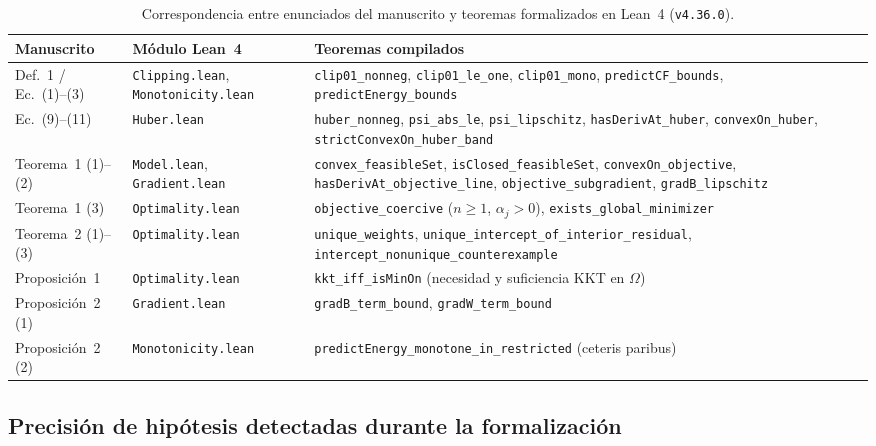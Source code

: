 \begin{table}[!htbp]
\centering
\caption{Correspondencia entre enunciados del manuscrito y teoremas formalizados en Lean~4 (\texttt{v4.36.0}).}
\label{tab:lean4-correspondencia}
\small
\begin{tabularx}{\textwidth}{@{}p{2.3cm}p{2.8cm}L@{}}
\toprule
\textbf{Manuscrito} & \textbf{Módulo Lean~4} & \textbf{Teoremas compilados} \\
\midrule
Def.~1 / Ec.~(1)--(3) & \texttt{Clipping.lean}, \texttt{Monotonicity.lean} & \texttt{clip01\_nonneg}, \texttt{clip01\_le\_one}, \texttt{clip01\_mono}, \texttt{predictCF\_bounds}, \texttt{predictEnergy\_bounds} \\
Ec.~(9)--(11) & \texttt{Huber.lean} & \texttt{huber\_nonneg}, \texttt{psi\_abs\_le}, \texttt{psi\_lipschitz}, \texttt{hasDerivAt\_huber}, \texttt{convexOn\_huber}, \texttt{strictConvexOn\_huber\_band} \\
Teorema~1 (1)--(2) & \texttt{Model.lean}, \texttt{Gradient.lean} & \texttt{convex\_feasibleSet}, \texttt{isClosed\_feasibleSet}, \texttt{convexOn\_objective}, \texttt{hasDerivAt\_objective\_line}, \texttt{objective\_subgradient}, \texttt{gradB\_lipschitz} \\
Teorema~1 (3) & \texttt{Optimality.lean} & \texttt{objective\_coercive} ($n\ge 1$, $\alpha_j>0$), \texttt{exists\_global\_minimizer} \\
Teorema~2 (1)--(3) & \texttt{Optimality.lean} & \texttt{unique\_weights}, \texttt{unique\_intercept\_of\_interior\_residual}, \texttt{intercept\_nonunique\_counterexample} \\
Proposición~1 & \texttt{Optimality.lean} & \texttt{kkt\_iff\_isMinOn} (necesidad y suficiencia KKT en $\Omega$) \\
Proposición~2 (1) & \texttt{Gradient.lean} & \texttt{gradB\_term\_bound}, \texttt{gradW\_term\_bound} \\
Proposición~2 (2) & \texttt{Monotonicity.lean} & \texttt{predictEnergy\_monotone\_in\_restricted} (ceteris paribus) \\
\bottomrule
\end{tabularx}
\end{table}

\subsection{Precisión de hipótesis detectadas durante la formalización}

